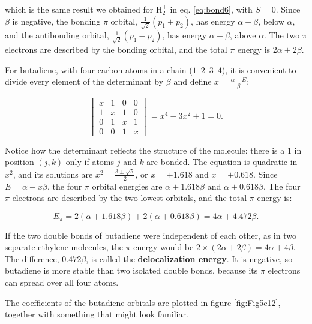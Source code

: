 \documentclass[
  english,
  9pt,
]{extbook}
\theoremstyle{definition}
\theoremstyle{definition}
\theoremstyle{definition}
\theoremstyle{definition}
\theoremstyle{remark}
\begin{document}
which is the same result we obtained for \(\mathrm{H}_2^+\) in eq. \eqref{eq:bond6}, with \(S=0\). Since \(\beta\) is negative, the bonding \(\pi\) orbital, \(\frac{1}{\sqrt{2}}(p_1+p_2)\), has energy \(\alpha+\beta\), below \(\alpha\), and the antibonding orbital, \(\frac{1}{\sqrt{2}}(p_1-p_2)\), has energy \(\alpha-\beta\), above \(\alpha\). The two \(\pi\) electrons are described by the bonding orbital, and the total \(\pi\) energy is \(2\alpha+2\beta\).

For butadiene, with four carbon atoms in a chain (\(1\)--\(2\)--\(3\)--\(4\)), it is convenient to divide every element of the determinant by \(\beta\) and define \(x=\frac{\alpha-E}{\beta}\):

\begin{equation}
\begin{vmatrix}
x & 1 & 0 & 0\\
1 & x & 1 & 0\\
0 & 1 & x & 1\\
0 & 0 & 1 & x
\end{vmatrix}=x^4-3x^2+1=0.
\label{eq:huckel3}
\end{equation}

Notice how the determinant reflects the structure of the molecule: there is a \(1\) in position \((j,k)\) only if atoms \(j\) and \(k\) are bonded. The equation is quadratic in \(x^2\), and its solutions are \(x^2=\frac{3\pm\sqrt{5}}{2}\), or \(x=\pm1.618\) and \(x=\pm0.618\). Since \(E=\alpha-x\beta\), the four \(\pi\) orbital energies are \(\alpha\pm1.618\beta\) and \(\alpha\pm0.618\beta\). The four \(\pi\) electrons are described by the two lowest orbitals, and the total \(\pi\) energy is:

\begin{equation}
E_\pi = 2(\alpha+1.618\beta)+2(\alpha+0.618\beta)=4\alpha+4.472\beta.
\label{eq:huckel4}
\end{equation}

If the two double bonds of butadiene were independent of each other, as in two separate ethylene molecules, the \(\pi\) energy would be \(2\times(2\alpha+2\beta)=4\alpha+4\beta\). The difference, \(0.472\beta\), is called the \textbf{delocalization energy}. It is negative, so butadiene is more stable than two isolated double bonds, because its \(\pi\) electrons can spread over all four atoms.

The coefficients of the butadiene orbitals are plotted in figure \ref{fig:Fig5c12}, together with something that might look familiar.
\end{document}

